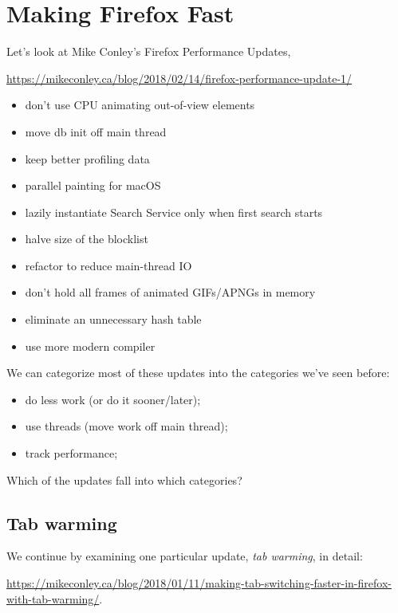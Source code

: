 




\section*{Making Firefox Fast}

Let's look at Mike Conley's Firefox Performance Updates,
\begin{center}
{\scriptsize
\vspace*{-1em}
\url{https://mikeconley.ca/blog/2018/02/14/firefox-performance-update-1/}
}
\end{center}
\vspace*{-1em}

\begin{itemize}[noitemsep]
\item don't use CPU animating out-of-view elements
\item move db init off main thread
\item keep better profiling data
\item parallel painting for macOS
\item lazily instantiate Search Service only when first search starts
\item halve size of the blocklist
\item refactor to reduce main-thread IO
\item don't hold all frames of animated GIFs/APNGs in memory
\item eliminate an unnecessary hash table
\item use more modern compiler
\end{itemize}

We can categorize most of these updates into the categories we've seen before:
\begin{itemize}[noitemsep]
\item do less work (or do it sooner/later);
\item use threads (move work off main thread);
\item track performance;
\end{itemize}
Which of the updates fall into which categories?

\subsection*{Tab warming} We continue by examining one particular update, \emph{tab warming}, in detail:
\begin{center}
\scriptsize
\vspace*{-1em}
\url{https://mikeconley.ca/blog/2018/01/11/making-tab-switching-faster-in-firefox-with-tab-warming/}.
\end{center}
\vspace*{-1em}

